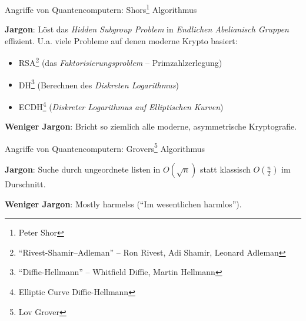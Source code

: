 \documentclass{rosenpass-beamer}
\let\say\enquote
\begin{document}
\begin{frame}{Angriffe von Quantencomputern: Shors\footnote{Peter Shor} Algorithmus}

\textbf{Jargon}: Löst das \emph{Hidden Subgroup Problem} in \emph{Endlichen Abelianisch Gruppen} effizient. U.a. viele Probleme auf denen moderne Krypto basiert:




\begin{itemize}
    \item RSA\footnote{\say{Rivest-Shamir–Adleman} -- Ron Rivest, Adi Shamir, Leonard Adleman} (das \emph{Faktorisierungsproblem} – Primzahlzerlegung)
    \item DH\footnote{\say{Diffie-Hellmann} -- Whitfield Diffie, Martin Hellmann} (Berechnen des \emph{Diskreten Logarithmus})
    \item ECDH\footnote{Elliptic Curve Diffie-Hellmann} (\emph{Diskreter Logarithmus auf Elliptischen Kurven})
\end{itemize}


\textbf{Weniger Jargon}: Bricht so ziemlich alle moderne, asymmetrische Kryptografie.

\end{frame}

\begin{frame}{Angriffe von Quantencomputern: Grovers\footnote{Lov Grover} Algorithmus}

\textbf{Jargon}: Suche durch ungeordnete listen in $O(\sqrt{n})$ statt klassisch $O(\frac{n}{2})$ im Durschnitt.

\vspace{5mm}


\textbf{Weniger Jargon}: Mostly harmelss (\say{Im wesentlichen harmlos}).

\end{frame}
\end{document}
